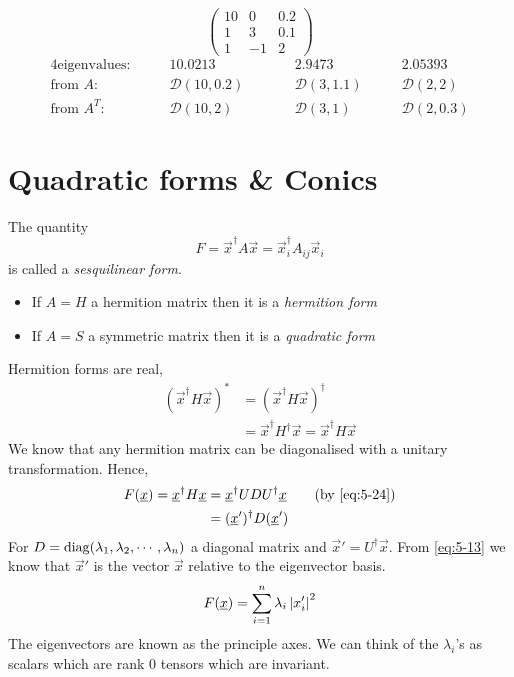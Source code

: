 \documentclass{article}
\numberwithin{equation}{section}
\begin{document}
\begin{eg}
    \[
        \begin{pmatrix}
        10 & 0 & 0.2 \\
        1 & 3 & 0.1 \\
        1 & -1 & 2
        \end{pmatrix}  
    \]
    \begin{alignat*}{4}
        \text{eigenvalues:} &\qquad 10.0213 &&\qquad 2.9473 &\qquad 2.05393 \\
        \text{from $A$:} &\qquad \mathcal{D}(10, 0.2) &&\qquad \mathcal{D}(3, 1.1) &\qquad \mathcal{D}(2, 2) \\
        \text{from $A^T$:} &\qquad \mathcal{D}(10, 2) &&\qquad \mathcal{D}(3, 1) &\qquad \mathcal{D}(2, 0.3)
    \end{alignat*}
\end{eg}

\section{Quadratic forms \& Conics}
\begin{defi}
    The quantity
    \begin{equation}\label{eq:6-1}
        F = \vec x^\dagger A \vec x = \vec{x}_i^\dagger A_{ij} \vec x_i
    \end{equation}
    is called a \emph{sesquilinear form}.
    \begin{itemize}
        \item If $A = H$ a hermition matrix then it is a \emph{hermition form}
        \item If $A = S$ a symmetric matrix then it is a \emph{quadratic form} 
    \end{itemize}
\end{defi}

Hermition forms are real,
\begin{align*}
    (\vec x^\dagger H \vec x)^* &= (\vec x^\dagger H \vec x)^\dagger \tag{since it is a ``scalar''}\\
    &= \vec x^\dagger H^\dagger \vec x = \vec x^\dagger H \vec x
\end{align*}
We know that any hermition matrix can be diagonalised with a unitary transformation. Hence,
\begin{align*}
    F(\vec x) = \vec x^\dagger H \vec x &= \vec x^\dagger U D U^\dagger \vec x \tag{by \eqref{eq:5-24}} \\
    &= (\vec x')^\dagger D (\vec x')
\end{align*}
For $D = \operatorname{diag}(\lambda_1, \lambda_2, \cdots, \lambda_n)$ a diagonal matrix and $\vec x' = U^\dagger \vec x$.
From \eqref{eq:5-13} we know that $\vec x'$ is the vector $\vec x$ relative to the eigenvector basis.
\begin{equation}\label{eq:6-2}
    F(\underline{x}) = \sum_{i=1}^{n} \lambda_i \left\lvert x'_i\right\rvert^2
\end{equation}
The eigenvectors are known as the principle axes. 
We can think of the $\lambda_i$'s as scalars which are rank $0$ tensors which are invariant.
\end{document}

